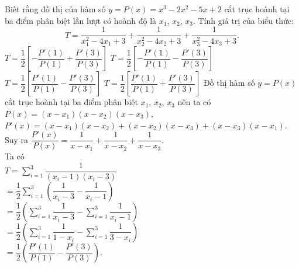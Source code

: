 \begin{ex}%
Biết rằng đồ thị của hàm số $y =P(x)=x^3-2x^2-5x+2$ cắt trục hoành tại ba điểm phân biệt lần lượt có hoành độ là $x_1$, $x_2$, $x_3$. Tính giá trị của biểu thức: $$T=\dfrac{1}{x_1^2-4x_1+3}+\dfrac{1}{x_2^2-4x_2+3}+\dfrac{1}{x_3^2-4x_3+3}.$$
 \choice 
{$T=\dfrac{1}{2}\left[ -\dfrac{P'(1)}{P(1)}+\dfrac{P'(3)}{P(3)}\right ]$}
{$T=\dfrac{1}{2}\left[ -\dfrac{P'(1)}{P(1)}-\dfrac{P'(3)}{P(3)}\right ]$}
{\True $T=\dfrac{1}{2}\left[ \dfrac{P'(1)}{P(1)}-\dfrac{P'(3)}{P(3)}\right ]$}
{$T=\dfrac{1}{2}\left[ \dfrac{P'(1)}{P(1)}+\dfrac{P'(3)}{P(3)}\right ]$}
\loigiai
{
Đồ thị hàm số $y=P(x)$ cắt trục hoành tại ba điểm phân biệt $x_1$, $x_2$, $x_3$ nên ta có\\
 $P(x) =(x-x_1)(x-x_2)(x-x_3)$,\\
 $P'(x) =(x-x_1)(x-x_2)+(x-x_2)(x-x_3)+(x-x_3)(x-x_1)$.\\
Suy ra $\dfrac{P'(x)}{P(x)}=\dfrac{1}{x-x_1}+\dfrac{1}{x-x_2}+\dfrac{1}{x-x_3}$.\\
Ta có \\
$T=\sum\limits_{i = 1}^3{\dfrac{1}{(x_i-1)(x_i-3)}}$\\
\hspace*{0.4cm}$= \dfrac{1}{2}\sum\limits_{i = 1}^3{\left (\dfrac{1}{x_i-3}-\dfrac{1}{x_i-1}\right )}$\\
\hspace*{0.4cm}$= \dfrac{1}{2}\left (\sum\limits_{i = 1}^3{\dfrac{1}{x_i-3}}-\sum\limits_{i = 1}^3{\dfrac{1}{x_i-1}}\right )$\\
\hspace*{0.4cm}$= \dfrac{1}{2}\left( \sum\limits_{i = 1}^3{\dfrac{1}{1-x_i}}-\sum\limits_{i = 1}^3{\dfrac{1}{3-x_i}}\right )$\\
\hspace*{0.4cm}$= \dfrac{1}{2}\left (\dfrac{P'(1)}{P(1)} -\dfrac{P'(3)}{P(3)}\right )$.
}
\end{ex}


